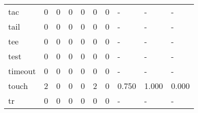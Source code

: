 \begin{longtable}{lp{1.3cm}p{1.3cm}p{1.3cm}p{1.3cm}p{1.3cm}p{1.3cm}p{1.3cm}p{1.3cm}p{1.3cm}}
tac       &                      0 &                                             0 &                                            0 &                                           0 &                                            0 &                                          0 &                                    - &                                      - &                                    - \\
tail      &                      0 &                                             0 &                                            0 &                                           0 &                                            0 &                                          0 &                                    - &                                      - &                                    - \\
tee       &                      0 &                                             0 &                                            0 &                                           0 &                                            0 &                                          0 &                                    - &                                      - &                                    - \\
test      &                      0 &                                             0 &                                            0 &                                           0 &                                            0 &                                          0 &                                    - &                                      - &                                    - \\
timeout   &                      0 &                                             0 &                                            0 &                                           0 &                                            0 &                                          0 &                                    - &                                      - &                                    - \\
touch     &                      2 &                                             0 &                                            0 &                                           0 &                                            2 &                                          0 &                                0.750 &                                  1.000 &                                0.000 \\
tr        &                      0 &                                             0 &                                            0 &                                           0 &                                            0 &                                          0 &                                    - &                                      - &                                    - \\

\end{longtable}
